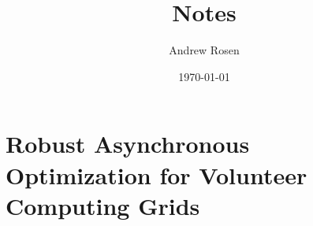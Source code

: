 \documentclass[a4paper]{article}
\title{Notes}
\author{Andrew Rosen}
\date{\today}
\begin{document}
\maketitle{}

\section{Robust Asynchronous Optimization for Volunteer Computing Grids}
\end{document}
